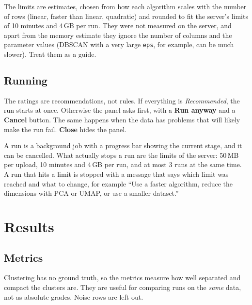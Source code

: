 \documentclass[11pt,a4paper]{article}
\newcommand{\ui}[1]{\textsf{\textbf{#1}}}   %
\newcommand{\param}[1]{\texttt{#1}}         %
\begin{document}
\begin{note}
The limits are estimates, chosen from how each algorithm scales with the number of rows (linear, faster than linear,
quadratic) and rounded to fit the server's limits of 10 minutes and 4\,GB per run. They were not measured on the
server, and apart from the memory estimate they ignore the number of columns and the parameter values (DBSCAN with a
very large \param{eps}, for example, can be much slower). Treat them as a guide.
\end{note}

\subsection{Running}

The ratings are recommendations, not rules. If everything is \emph{Recommended}, the run starts at once. Otherwise
the panel asks first, with a \ui{Run anyway} and a \ui{Cancel} button. The same happens when the data has problems
that will likely make the run fail. \ui{Close} hides the panel.

A run is a background job with a progress bar showing the current stage, and it can be cancelled. What actually
stops a run are the limits of the server: 50\,MB per upload, 10 minutes and 4\,GB per run, and at most 3 runs at the
same time. A run that hits a limit is stopped with a message that says which limit was reached and what to change,
for example ``Use a faster algorithm, reduce the dimensions with PCA or UMAP, or use a smaller dataset.''

\section{Results}

\subsection{Metrics}

Clustering has no ground truth, so the metrics measure how well separated and compact the clusters are. They are
useful for comparing runs on the \emph{same} data, not as absolute grades. Noise rows are left out.
\end{document}
